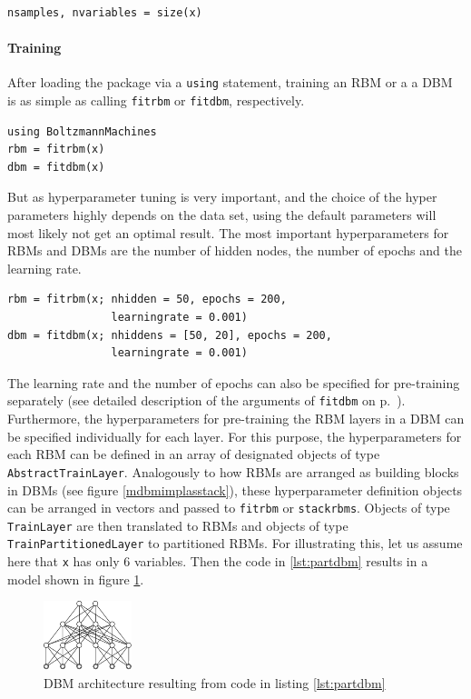 \documentclass[12pt]{article}
\newcommand{\inlinecode}[1]{\texttt{#1}}
\begin{document}
\begin{lstlisting}
nsamples, nvariables = size(x)
\end{lstlisting}

\paragraph{Training}

After loading the package via a \inlinecode{using} statement, training an RBM or a a DBM is as simple as calling \inlinecode{fitrbm} or \inlinecode{fitdbm}, respectively.

\begin{lstlisting}
using BoltzmannMachines
rbm = fitrbm(x)
dbm = fitdbm(x)
\end{lstlisting}

But as hyperparameter tuning is very important, and the choice of the hyper parameters highly depends on the data set, using the default parameters will most likely not get an optimal result.
The most important hyperparameters for RBMs and DBMs are the number of hidden nodes, the number of epochs and the learning rate.

\begin{lstlisting}
rbm = fitrbm(x; nhidden = 50, epochs = 200, 
                learningrate = 0.001)
dbm = fitdbm(x; nhiddens = [50, 20], epochs = 200, 
                learningrate = 0.001)
\end{lstlisting}

The learning rate and the number of epochs can also be specified for pre-training separately (see detailed description of the arguments of \inlinecode{fitdbm} on p.\ \pageref{bms_fitdbm}).
Furthermore, the hyperparameters for pre-training the RBM layers in a DBM can be specified individually for each layer.
For this purpose, the hyperparameters for each RBM can be defined in an array of designated objects of type \inlinecode{AbstractTrainLayer}.
Analogously to how RBMs are arranged as building blocks in DBMs (see figure  \ref{mdbmimplasstack}), these hyperparameter definition objects can be arranged in vectors and passed to \inlinecode{fitrbm} or \inlinecode{stackrbms}.
Objects of type \inlinecode{TrainLayer} are then translated to RBMs and objects of type \inlinecode{TrainPartitionedLayer} to partitioned RBMs.
For illustrating this, let us assume here that \inlinecode{x} has only 6 variables.
Then the code in \ref{lst:partdbm} results in a model shown in figure \ref{fig:smallpartitioneddbm}.

\begin{figure}[h]
   \centering
   \includegraphics[scale=3.]{images/SmallPartitionedDBM.pdf}
   \caption{DBM architecture resulting from code in listing \ref{lst:partdbm}}
\label{fig:smallpartitioneddbm}
\end{figure}
\end{document}
